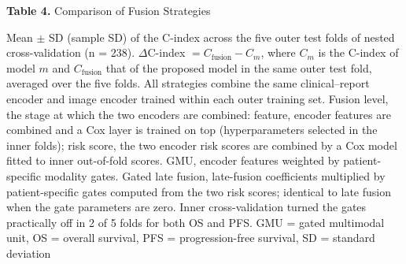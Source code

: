 \documentclass[border=8pt]{standalone}
\newif\ifshowtitle \showtitletrue
\newif\ifshownotes \shownotestrue
\begin{document}
\sbox{}%
\begin{minipage}{\wd\tablebox}
\ifshowtitle\noindent \textbf{Table 4.} Comparison of Fusion Strategies\par\vspace{4pt}\fi
\noindent\usebox\tablebox
\ifshownotes\par\vspace{3pt}\footnotesize\noindent Mean $\pm$ SD (sample SD) of the C-index across the five outer test folds of nested cross-validation (n = 238). $\Delta$C-index $= C_{\mathrm{fusion}} - C_{m}$, where $C_{m}$ is the C-index of model $m$ and $C_{\mathrm{fusion}}$ that of the proposed model in the same outer test fold, averaged over the five folds. All strategies combine the same clinical--report encoder and image encoder trained within each outer training set. Fusion level, the stage at which the two encoders are combined: feature, encoder features are combined and a Cox layer is trained on top (hyperparameters selected in the inner folds); risk score, the two encoder risk scores are combined by a Cox model fitted to inner out-of-fold scores. GMU, encoder features weighted by patient-specific modality gates. Gated late fusion, late-fusion coefficients multiplied by patient-specific gates computed from the two risk scores; identical to late fusion when the gate parameters are zero. Inner cross-validation turned the gates practically off in 2 of 5 folds for both OS and PFS. GMU = gated multimodal unit, OS = overall survival, PFS = progression-free survival, SD = standard deviation\par\fi
\end{minipage}
\end{document}
